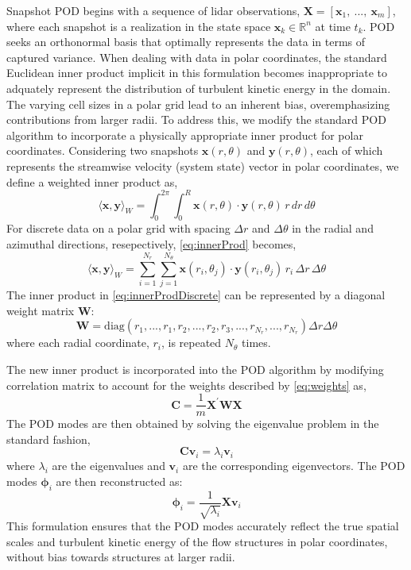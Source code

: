 \documentclass[%
 aip,
 amsmath,
 amssymb,
]{revtex4-2}
\begin{document}
Snapshot POD begins with a sequence of lidar observations, $\mathbf{X} = [\mathbf{x}_1,~...,~\mathbf{x}_m]$, where each snapshot is a realization in the state space $\mathbf{x}_k \in \mathbb{R}^n$ at time $t_k$. 
POD seeks an orthonormal basis that optimally represents the data in terms of captured variance.
When dealing with data in polar coordinates, the standard Euclidean inner product implicit in this formulation becomes inappropriate to adquately represent the distribution of turbulent kinetic energy in the domain. 
The varying cell sizes in a polar grid lead to an inherent bias, overemphasizing contributions from larger radii. 
To address this, we modify the standard POD algorithm to incorporate a physically appropriate inner product for polar coordinates.
Considering two snapshots $\mathbf{x}(r,\theta)$ and $\mathbf{y}(r,\theta)$, each of which represents the streamwise velocity (system state) vector in polar coordinates, we define a weighted inner product as,
\begin{equation}
\langle \mathbf{x}, \mathbf{y} \rangle_W = \int_0^{2\pi} \int_0^R \mathbf{x}(r,\theta) \cdot \mathbf{y}(r,\theta) \, r \, dr \, d\theta
\label{eq:innerProd}
\end{equation}
For discrete data on a polar grid with spacing $\Delta r$ and $\Delta \theta$ in the radial and azimuthal directions, resepectively, \cref{eq:innerProd} becomes,
\begin{equation}
\langle \mathbf{x}, \mathbf{y} \rangle_W = \sum_{i=1}^{N_r} \sum_{j=1}^{N_\theta} \mathbf{x}(r_i, \theta_j) \cdot \mathbf{y}(r_i, \theta_j) \, r_i \, \Delta r \, \Delta \theta
\label{eq:innerProdDiscrete}
\end{equation}
The inner product in \cref{eq:innerProdDiscrete} can be represented by a diagonal weight matrix $\mathbf{W}$:
\begin{equation}
\mathbf{W} = \text{diag}(r_1, ..., r_1, r_2, ..., r_2, r_3, ..., r_{N_r}, ..., r_{N_r}) \Delta r \Delta \theta
\label{eq:weights}
\end{equation}
where each radial coordinate, $r_i$, is repeated $N_\theta$ times.

The new inner product is incorporated into the POD algorithm by modifying correlation matrix to account for the weights described by \cref{eq:weights} as,
\begin{equation}
\mathbf{C} = \frac{1}{m}\mathbf{X}^\prime\mathbf{W}\mathbf{X}
\label{eq:weightedCorr}
\end{equation}
The POD modes are then obtained by solving the eigenvalue problem in the standard fashion,
\begin{equation}
\mathbf{C}\mathbf{v}_i = \lambda_i\mathbf{v}_i
\end{equation}
where $\lambda_i$ are the eigenvalues and $\mathbf{v}_i$ are the corresponding eigenvectors.
The POD modes $\mathbf{\phi}_i$ are then reconstructed as:
\begin{equation}
\mathbf{\phi}_i = \frac{1}{\sqrt{\lambda_i}}\mathbf{X}\mathbf{v}_i
\label{eq:modes}
\end{equation}
This formulation ensures that the POD modes accurately reflect the true spatial scales and turbulent kinetic energy of the flow structures in polar coordinates, without bias towards structures at larger radii.
\end{document}
